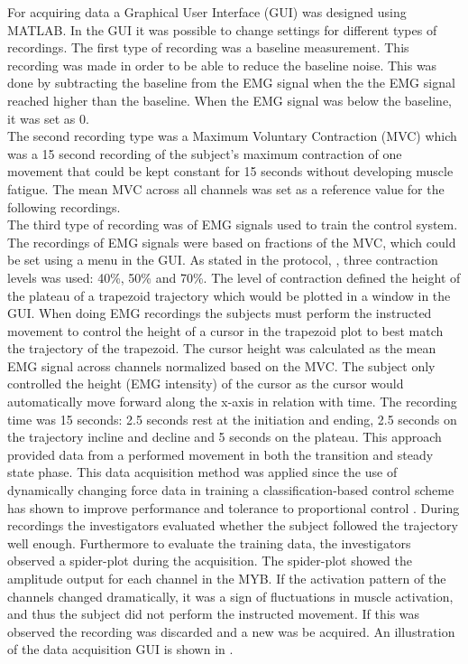 For acquiring data a Graphical User Interface (GUI) was designed using MATLAB. In the GUI it was possible to change settings for different types of recordings. The first type of recording was a baseline measurement. This recording was made in order to be able to reduce the baseline noise. This was done by subtracting the baseline from the EMG signal when the the EMG signal reached higher than the baseline. When the EMG signal was below the baseline, it was set as 0. \\
The second recording type was a Maximum Voluntary Contraction (MVC) which was a 15 second recording of the subject's maximum contraction of one movement that could be kept constant for 15 seconds without developing muscle fatigue. The mean MVC across all channels was set as a reference value for the following recordings. \\
The third type of recording was of EMG signals used to train the control system. The recordings of EMG signals were based on fractions of the MVC, which could be set using a menu in the GUI. As stated in the protocol, , three contraction levels was used: 40\%, 50\% and 70\%. The level of contraction defined the height of the plateau of a trapezoid trajectory which would be plotted in a window in the GUI. When doing EMG recordings the subjects must perform the instructed movement to control the height of a cursor in the trapezoid plot to best match the trajectory of the trapezoid. The cursor height was calculated as the mean EMG signal across channels normalized based on the MVC. The subject only controlled the height (EMG intensity) of the cursor as the cursor would automatically move forward along the x-axis in relation with time. The recording time was 15 seconds: 2.5 seconds rest at the initiation and ending, 2.5 seconds on the trajectory incline and decline and 5 seconds on the plateau. This approach provided data from a performed movement in both the transition and steady state phase. This data acquisition method was applied since the use of dynamically changing force data in training a classification-based control scheme has shown to improve performance and tolerance to proportional control \cite{Scheme2015}. 
During recordings the investigators evaluated whether the subject followed the trajectory well enough. Furthermore to evaluate the training data, the investigators observed a spider-plot during the acquisition. The spider-plot showed the amplitude output for each channel in the MYB. If the activation pattern of the channels changed dramatically, it was a sign of fluctuations in muscle activation, and thus the subject did not perform the instructed movement. If this was observed the recording was discarded and a new was be acquired. An illustration of the data acquisition GUI is shown in .

